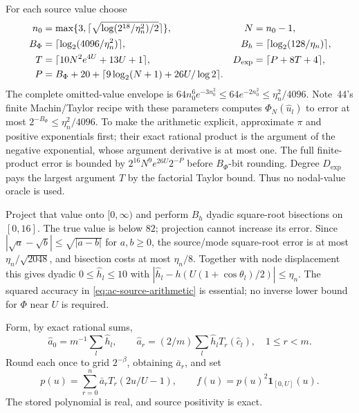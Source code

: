 For each source value choose
\begin{align}
 n_0&=\max\{3,\lceil\sqrt{\log(2^{18}/\eta_n^2)/2}\rceil\},
 &N&=n_0-1,\notag\\
 B_\Phi&=\lceil\log_2(4096/\eta_n^2)\rceil,&
 B_h&=\lceil\log_2(128/\eta_n)\rceil,\notag\\
 T&=\lceil10N^2e^{4U}+13U+1\rceil,&
 D_{\exp}&=\lceil P+8T+4\rceil,\notag\\
 P&=B_\Phi+20+\lceil9\log_2(N+1)+26U/\log2\rceil.
 \label{eq:ac-source-arithmetic}
\end{align}
The complete omitted-value envelope is
$64n_0^6e^{-3n_0^2}\le64e^{-2n_0^2}\le\eta_n^2/4096$.
Note~44's finite Machin/Taylor recipe \cite{n44} with these parameters
computes $\Phi_N(\widehat u_l)$ to error at most
$2^{-B_\Phi}\le\eta_n^2/4096$. To make the arithmetic explicit,
approximate $\pi$ and positive exponentials first; their exact rational
product is the argument of the negative exponential, whose argument
derivative is at most one. The full finite-product error is bounded by
$2^{16}N^9e^{26U}2^{-P}$ before $B_\Phi$-bit rounding.
Degree $D_{\exp}$ pays the largest argument $T$ by the factorial
Taylor bound. Thus no nodal-value oracle is used.

Project that value onto $[0,\infty)$ and perform $B_h$ dyadic
square-root bisections on $[0,16]$. The true value is below $82$;
projection cannot increase its error. Since
$|\sqrt a-\sqrt b|\le\sqrt{|a-b|}$ for $a,b\ge0$, the
source/mode square-root error is at most $\eta_n/\sqrt{2048}$,
and bisection costs at most $\eta_n/8$. Together with node
displacement this gives dyadic $0\le\widehat h_l\le10$ with
$|\widehat h_l-h(U(1+\cos\theta_l)/2)|\le\eta_n$.
The squared accuracy in \eqref{eq:ac-source-arithmetic} is essential;
no inverse lower bound for $\Phi$ near $U$ is required.

Form, by exact rational sums,
\[
 \widehat a_0=m^{-1}\sum_l\widehat h_l,\qquad
 \widehat a_r=(2/m)\sum_l\widehat h_lT_r(\widehat c_l),\quad1\le r<m.
\]
Round each once to grid $2^{-\beta}$, obtaining $\bar a_r$, and set
\begin{equation}
 p(u)=\sum_{r=0}^n\bar a_rT_r(2u/U-1),\qquad
 f(u)=p(u)^2\mathbf1_{[0,U]}(u).
 \label{eq:ac-positive-source}
\end{equation}
The stored polynomial is real, and source positivity is exact.


